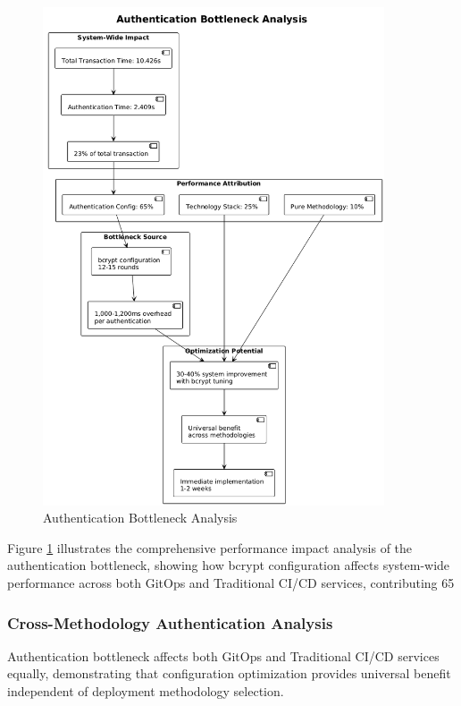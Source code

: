 \begin{figure}[H]
\centering
\includegraphics[width=0.9\textwidth]{figures/Authentication-Bottleneck-Analysis.png}
\caption{Authentication Bottleneck Analysis}
\label{fig:authentication-bottleneck-analysis}
\end{figure}

Figure \ref{fig:authentication-bottleneck-analysis} illustrates the comprehensive performance impact analysis of the authentication bottleneck, showing how bcrypt configuration affects system-wide performance across both GitOps and Traditional CI/CD services, contributing 65%


\subsubsection{Cross-Methodology Authentication Analysis}

Authentication bottleneck affects both GitOps and Traditional CI/CD services equally, demonstrating that configuration optimization provides universal benefit independent of deployment methodology selection.

